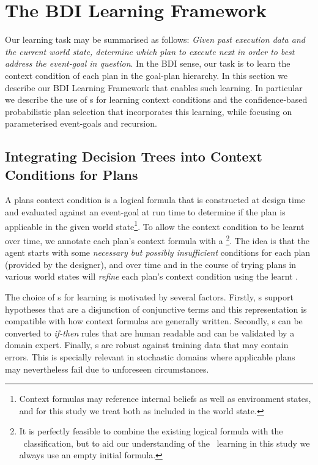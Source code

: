 \section{The BDI Learning Framework}\label{sec:framework}

Our learning task may be summarised as follows: \textit{Given past execution data and the current world state, determine which plan to execute next in order to best address the event-goal in question}. In the BDI sense, our task is to learn the context condition of each plan in the goal-plan hierarchy. In this section we describe our BDI Learning Framework that enables such learning. In particular we describe the use of \dt s for learning context conditions and the confidence-based probabilistic plan selection that incorporates this learning, while focusing on parameterised event-goals and recursion.

\subsection{Integrating Decision Trees into Context Conditions for Plans}
\label{sec:decision_trees}

A plans context condition is a logical formula that is constructed at design time and evaluated against an event-goal at run time to determine if the plan is applicable in the given world state\footnote{Context formulas may reference internal beliefs as well as environment states, and for this study we treat both as included in the world state.}. To allow the context condition to be learnt over time, we annotate each plan's context formula with a \textit{\dt}\footnote{It is perfectly feasible to combine the existing logical formula with the \dt\ classification, but to aid our understanding of the \dt\ learning in this study we always use an empty initial formula.}\cite{Airiau:IJAT:09}. The idea is that the agent starts with some \textit{necessary but possibly insufficient} conditions for each plan (provided by the designer), and over time and in the course of trying plans in various world states will \textit{refine} each plan's context condition using the learnt \dt.
 
The choice of \dt s for learning is motivated by several factors. Firstly, \dt s support hypotheses that are a disjunction of conjunctive terms and this representation is compatible with how context formulas are generally written. Secondly, \dt s can be converted to \textit{if-then} rules that are human readable and can be validated by a domain expert. Finally, \dt s are robust against training data that may contain errors. This is specially relevant in stochastic domains where applicable plans may nevertheless fail due to unforeseen circumstances.

